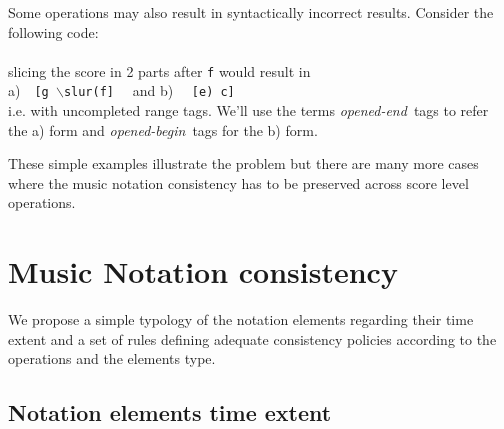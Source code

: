 \documentclass[twoside,10pt,a4paper]{article}
\newcommand{\code}[1]	{{\small \texttt{#1}}}
\newcommand{\gtag}[1]	{$\backslash$\code{#1}}
\newcommand{\oend}		{\emph{opened-end}}
\newcommand{\obeg}		{\emph{opened-begin}}
\newcommand{\codeindent}	{\\ \hspace*{9mm}}
\begin{document}
Some operations may also result in syntactically incorrect results. Consider the following code:
\codeindent \code{[g \gtag{slur}(f e) c]} \\
slicing the score in 2 parts after \code{f} would result in 
\codeindent a)\ \ \code{[g \gtag{slur}(f]} \ \  and b) \ \  \code{[e) c]} \\
i.e. with uncompleted range tags. We'll use the terms \oend\ tags to refer the a) form and \obeg\ tags for the b) form.

These simple examples illustrate the problem but there are many more cases where the music notation consistency has to be preserved across score level operations.

\section{Music Notation consistency}

We propose a simple typology of the notation elements regarding their time extent and a set of rules defining adequate consistency policies according to the operations and the elements type.

\subsection{Notation elements time extent}
\end{document}
